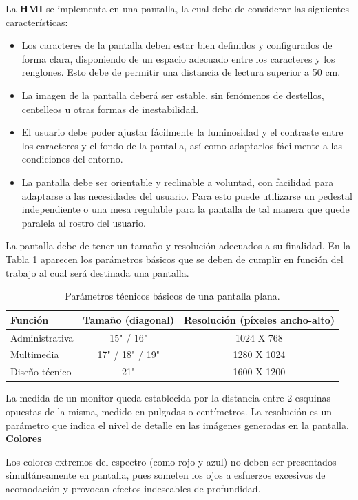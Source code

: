 La \textbf{HMI} se implementa en una pantalla, la cual debe de considerar las siguientes características:
\begin{itemize}
    \item Los caracteres de la pantalla deben estar bien definidos y configurados de forma clara, disponiendo de un espacio adecuado entre los caracteres y los renglones. Esto debe de permitir una distancia de lectura superior a 50 cm.
    \item La imagen de la pantalla deberá ser estable, sin fenómenos de destellos, centelleos u otras formas de inestabilidad.
    \item El usuario debe poder ajustar fácilmente la luminosidad y el contraste entre los caracteres y el fondo de la pantalla, así como adaptarlos fácilmente a las condiciones del entorno.
    \item La pantalla debe ser orientable y reclinable a voluntad, con facilidad para adaptarse a las necesidades del usuario. Para esto puede utilizarse un pedestal independiente o una mesa regulable para la pantalla de tal manera que quede paralela al rostro del usuario.
\end{itemize}
La pantalla debe de tener un tamaño y resolución adecuados a su finalidad. En la Tabla \ref{tab:inter1} aparecen los parámetros básicos que se deben de cumplir en función del trabajo al cual será destinada una pantalla.
\begin{table}[H]
  \centering
  \caption{Parámetros técnicos básicos de una pantalla plana.}
    \begin{tabular}{|l|c|c|}
    \hline
    \textbf{Función} & \textbf{Tamaño (diagonal)} & \textbf{Resolución (píxeles ancho-alto)} \\
    \hline
    Administrativa & 15" / 16" & 1024 X 768 \\
    \hline
    Multimedia & 17" / 18" / 19" & 1280 X 1024 \\
    \hline
    Diseño técnico & 21" & 1600 X 1200 \\
    \hline
    \end{tabular}%
  \label{tab:inter1}%
\end{table}%
La medida de un monitor queda establecida por la distancia entre 2 esquinas opuestas de la misma, medido en pulgadas o centímetros. La resolución es un parámetro que indica el nivel de detalle en las imágenes generadas en la pantalla.\\

\textbf{Colores}

Los colores extremos del espectro (como rojo y azul) no deben ser presentados simultáneamente en pantalla, pues someten los ojos a esfuerzos excesivos de acomodación y provocan efectos indeseables de profundidad.

